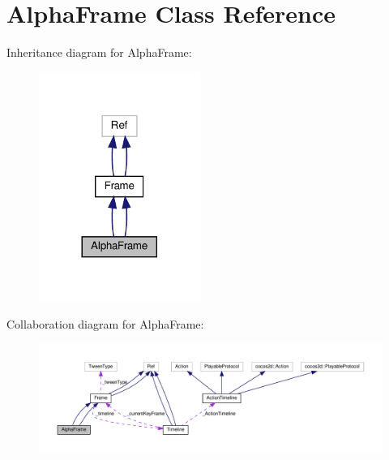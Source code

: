 \hypertarget{classAlphaFrame}{}\section{Alpha\+Frame Class Reference}
\label{classAlphaFrame}


Inheritance diagram for Alpha\+Frame\+:
\nopagebreak
\begin{figure}[H]
\begin{center}
\leavevmode
\includegraphics[width=149pt]{classAlphaFrame__inherit__graph}
\end{center}
\end{figure}


Collaboration diagram for Alpha\+Frame\+:
\nopagebreak
\begin{figure}[H]
\begin{center}
\leavevmode
\includegraphics[width=350pt]{classAlphaFrame__coll__graph}
\end{center}
\end{figure}
